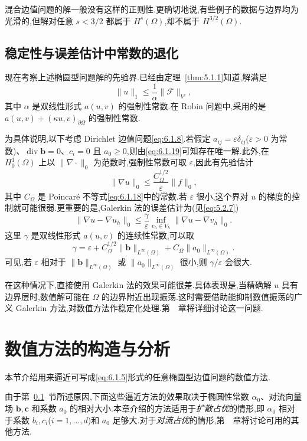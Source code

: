 混合边值问题的解一般没有这样的正则性.更确切地说,有些例子的数据与边界均为光滑的,但解对任意 \(s<3/2\) 都属于 \(H^s(\Omega)\),却不属于 \(H^{3/2}(\Omega)\).

\subsection{稳定性与误差估计中常数的退化}\label{sec:6.1.4}

现在考察上述椭圆型问题解的先验界.已经由定理~\ref{thm:5.1.1}知道,解满足
\[
  \|u\|_1\le\frac1\alpha\|\mathcal F\|_{V'},
\]
其中 \(\alpha\) 是双线性形式 \(a(u,v)\) 的强制性常数.在 Robin 问题中,采用的是 \(a(u,v)+(\kappa u,v)_{\partial\Omega}\) 的强制性常数.

为具体说明,以下考虑 Dirichlet 边值问题\eqref{eq:6.1.8}.若假定 \(a_{ij}=\varepsilon\delta_{ij}\)(\(\varepsilon>0\) 为常数)、\(\operatorname{div}\boldsymbol{b}=0\)、\(c_i=0\) 且 \(a_0\ge0\),则由\eqref{eq:6.1.19}可知存在唯一解.此外,在 \(H_0^1(\Omega)\) 上以 \(\|\nabla\cdot\|_0\) 为范数时,强制性常数可取 \(\varepsilon\),因此有先验估计
\[
  \|\nabla u\|_0\le\frac{C_\Omega^{1/2}}{\varepsilon}\|f\|_0,
\]
其中 \(C_\Omega\) 是 Poincaré 不等式\eqref{eq:6.1.18}中的常数.若 \(\varepsilon\) 很小,这个界对 \(u\) 的梯度的控制就可能很弱.更重要的是,Galerkin 法的误差估计为(见\eqref{eq:5.2.7})
\begin{equation}\label{eq:6.1.30}
  \|\nabla u-\nabla u_h\|_0
  \le\frac\gamma\varepsilon\inf_{v_h\in V_h}\|\nabla u-\nabla v_h\|_0.
\end{equation}
这里 \(\gamma\) 是双线性形式 \(a(u,v)\) 的连续性常数,可以取
\[
  \gamma=\varepsilon+C_\Omega^{1/2}\|\boldsymbol{b}\|_{L^\infty(\Omega)}
                +C_\Omega\|a_0\|_{L^\infty(\Omega)}.
\]
可见,若 \(\varepsilon\) 相对于 \(\|\boldsymbol{b}\|_{L^\infty(\Omega)}\) 或 \(\|a_0\|_{L^\infty(\Omega)}\) 很小,则 \(\gamma/\varepsilon\) 会很大.

在这种情况下,直接使用 Galerkin 法的效果可能很差.具体表现是,当精确解 \(u\) 具有边界层时,数值解可能在 \(\Omega\) 的边界附近出现振荡.这时需要借助能抑制数值振荡的广义 Galerkin 方法,对数值方法作稳定化处理.第~~章将详细讨论这一问题.

\section{数值方法的构造与分析}\label{sec:6.2}

本节介绍用来逼近可写成\eqref{eq:6.1.5}形式的任意椭圆型边值问题的数值方法.

由于第~\ref{sec:6.1.4}~节所述原因,下面这些逼近方法的效果取决于椭圆性常数 \(\alpha_0\)、对流向量场 \(\boldsymbol{b},\boldsymbol{c}\) 和系数 \(a_0\) 的相对大小.本章介绍的方法适用于\emph{扩散占优}的情形,即 \(\alpha_0\) 相对于系数 \(b_i,c_i\)(\(i=1,\ldots,d\))和 \(a_0\) 足够大.对于\emph{对流占优}的情形,第~~章将讨论可用的其他方法.

